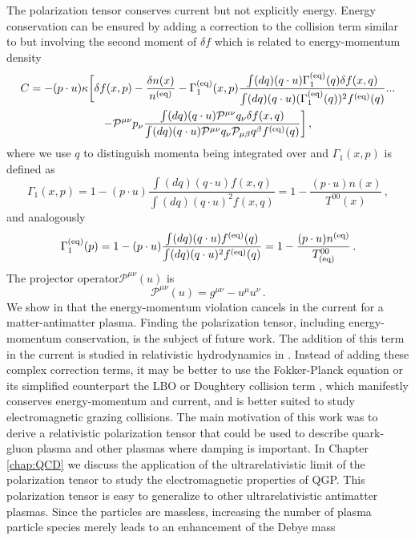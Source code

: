 The polarization tensor  conserves current but not explicitly energy. Energy conservation can be ensured by adding a correction to the collision term similar to  but involving the second moment of $\delta f$ which is related to energy-momentum density \cite{Rocha:2021zcw}
\begin{multline}
    C = - (p\cdot u) \kappa\bigg[\delta f(x,p) -\frac{\delta n(x) }{ n^{(\mathrm{eq})} } -\Gamma_1^{(\mathrm{eq})}(x,p)\frac{\int (dq) (q\cdot u)\Gamma_1^{(\mathrm{eq})}(q) \delta f(x,q) }{\int (dq) (q\cdot u) (\Gamma_1^{(\mathrm{eq})}(q))^2 f^{(\mathrm{eq})}(q) }...\\
    -\mathcal{P}^{\mu \nu}p_\nu\frac{\int (dq) (q\cdot u)\mathcal{P}^{\mu \nu}q_\nu \delta f(x,q) }{\int (dq) (q\cdot u) \mathcal{P}^{\mu \nu}q_\nu\mathcal{P}_{\mu \beta}q^\beta f^{(\mathrm{eq})}(q) }
    \bigg]\,,
\end{multline}
where we use $q$ to distinguish momenta being integrated over and $\Gamma_1(x,p)$ is defined as
\begin{equation}
    \Gamma_1(x,p) = 1-(p\cdot u)\frac{\int (dq) (q\cdot u)f(x,q)}{\int (dq) (q\cdot u)^2f(x,q)}
    = 1-\frac{ (p\cdot u) n(x)}{T^{00}(x)}\,,
\end{equation}
and analogously
\begin{equation}
    \Gamma_1^{(\mathrm{eq})}(p) = 1-(p\cdot u)\frac{\int (dq) (q\cdot u)f^{(\mathrm{eq})}(q)}{\int (dq) (q\cdot u)^2f^{(\mathrm{eq})}(q)}
    = 1-\frac{ (p\cdot u) n^{(\mathrm{eq})}}{T_{(\text{eq})}^{00}} \,.
\end{equation}
The projector operator$\mathcal{P}^{\mu \nu}(u)$ is 
\begin{equation}
    \mathcal{P}^{\mu \nu}(u) = g^{\mu \nu} -u^\mu u^\nu\,.
\end{equation}
We show in \cite{Grayson:2022asf} that the energy-momentum violation cancels in the current for a matter-antimatter plasma. Finding the polarization tensor, including energy-momentum conservation, is the subject of future work. The addition of this term in the current is studied in relativistic hydrodynamics in \cite{Singha:2023eia}. Instead of adding these complex correction terms, it may be better to use the Fokker-Planck equation or its simplified counterpart the LBO or Doughtery collision term \cite{Dougherty1964,Francisquez:2022imd,Ong:1970evs}, which manifestly conserves energy-momentum and current, and is better suited to study electromagnetic grazing collisions. 
The main motivation of this work was to derive a relativistic polarization tensor that could be used to describe quark-gluon plasma and other plasmas where damping is important. In Chapter \ref{chap:QCD} we discuss the application of the ultrarelativistic limit of the polarization tensor to study the electromagnetic properties of QGP. This polarization tensor is easy to generalize to other ultrarelativistic antimatter plasmas. Since the particles are massless, increasing the number of plasma particle species merely leads to an enhancement of the Debye mass \cite{Grayson:2022asf,Kapusta:1992fm}
